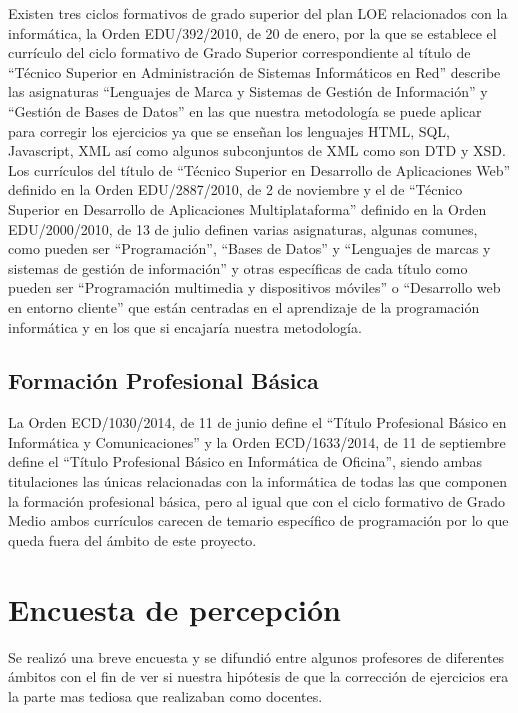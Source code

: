 Existen tres ciclos formativos de grado superior del plan LOE relacionados con la informática, la Orden EDU/392/2010, de 20 de enero, por la que se establece el currículo del ciclo formativo de Grado Superior correspondiente al título de ``Técnico Superior en Administración de Sistemas Informáticos en Red'' describe las asignaturas ``Lenguajes de Marca y Sistemas de Gestión de Información'' y ``Gestión de Bases de Datos'' en las que nuestra metodología se puede aplicar para corregir los ejercicios ya que se enseñan los lenguajes HTML, SQL, Javascript, XML así como algunos subconjuntos de XML como son DTD y XSD. Los currículos del título de ``Técnico Superior en Desarrollo de Aplicaciones Web'' definido en la Orden EDU/2887/2010, de 2 de noviembre y el de ``Técnico Superior en Desarrollo de Aplicaciones Multiplataforma'' definido en la Orden EDU/2000/2010, de 13 de julio definen varias asignaturas, algunas comunes, como pueden ser ``Programación'', ``Bases de Datos'' y ``Lenguajes de marcas y sistemas de gestión de información'' y otras específicas de cada título como pueden ser ``Programación multimedia y dispositivos móviles'' o ``Desarrollo web en entorno cliente'' que están centradas en el aprendizaje de la programación informática y en los que si encajaría nuestra metodología.


\subsection {Formación Profesional Básica}

La Orden ECD/1030/2014, de 11 de junio define el ``Título Profesional Básico en Informática y Comunicaciones'' y la Orden ECD/1633/2014, de 11 de septiembre define el  ``Título Profesional Básico en Informática de Oficina'', siendo ambas titulaciones las únicas relacionadas con la informática de todas las que componen la formación profesional básica, pero al igual que con el ciclo formativo de Grado Medio ambos currículos carecen de temario específico de programación por lo que queda fuera del ámbito de este proyecto.


\section{Encuesta de percepción}

Se realizó una breve encuesta y se difundió entre algunos profesores de diferentes ámbitos con el fin de ver si nuestra hipótesis de que la corrección de ejercicios era la parte mas tediosa que realizaban como docentes.

